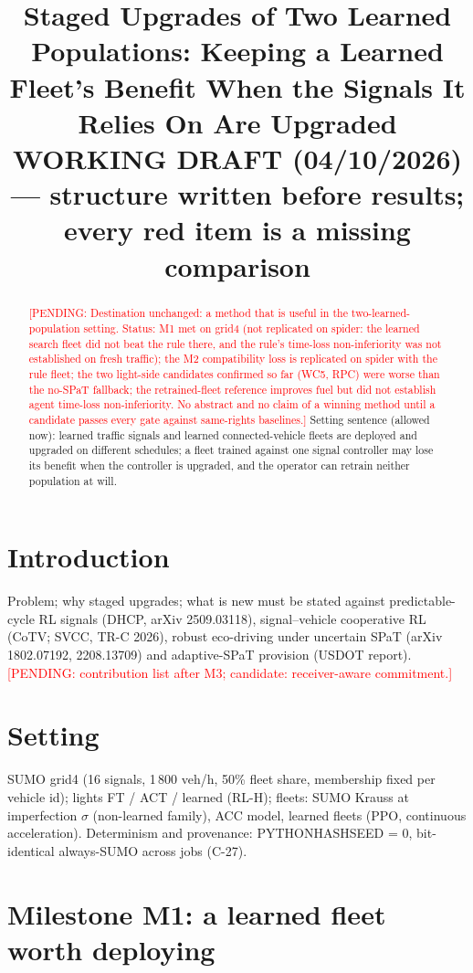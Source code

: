 \documentclass[11pt]{article}
\title{Staged Upgrades of Two Learned Populations: Keeping a Learned Fleet's Benefit When the Signals It Relies On Are Upgraded\\[4pt]
\large WORKING DRAFT (04/10/2026) --- structure written before results; every red item is a missing comparison}
\date{}
\newcommand{\pending}[1]{\textcolor{red}{[PENDING: #1]}}
\begin{document}
\maketitle

\begin{abstract}
\pending{Destination unchanged: a method that is useful in the two-learned-population setting. Status: M1 met on grid4 (not replicated on
spider: the learned search fleet did not beat the rule there, and the rule's time-loss non-inferiority was not established on fresh traffic);
the M2 compatibility loss is replicated on spider with the rule fleet; the two light-side candidates confirmed so far (WC5, RPC) were worse
than the no-SPaT fallback; the retrained-fleet reference improves fuel but did not establish agent time-loss non-inferiority. No abstract
and no claim of a winning method until a candidate passes every gate against same-rights baselines.}
Setting sentence (allowed now): learned traffic signals and learned connected-vehicle fleets are deployed and upgraded on different
schedules; a fleet trained against one signal controller may lose its benefit when the controller is upgraded, and the operator can
retrain neither population at will.
\end{abstract}

\section{Introduction}
Problem; why staged upgrades; what is new must be stated against predictable-cycle RL signals (DHCP, arXiv 2509.03118),
signal--vehicle cooperative RL (CoTV; SVCC, TR-C 2026), robust eco-driving under uncertain SPaT (arXiv 1802.07192, 2208.13709) and
adaptive-SPaT provision (USDOT report). \pending{contribution list after M3; candidate: receiver-aware commitment.}

\section{Setting}
SUMO grid4 (16 signals, 1\,800 veh/h, 50\% fleet share, membership fixed per vehicle id); lights FT / ACT / learned (RL-H);
fleets: SUMO Krauss at imperfection $\sigma$ (non-learned family), ACC model, learned fleets (PPO, continuous acceleration).
Determinism and provenance: PYTHONHASHSEED = 0, bit-identical always-SUMO across jobs (C-27).

\section{Milestone M1: a learned fleet worth deploying}
\end{document}
